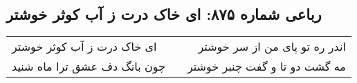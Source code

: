 \begin{center}
\section*{رباعی شماره ۸۷۵: ای خاک درت ز آب کوثر خوشتر}
\label{sec:0875}
\begin{longtable}{l p{0.5cm} r}
ای خاک درت ز آب کوثر خوشتر
&&
اندر ره تو پای من از سر خوشتر
\\
چون بانگ دف عشق ترا ماه شنید
&&
مه گشت دو تا و گفت چنبر خوشتر
\\
\end{longtable}
\end{center}
